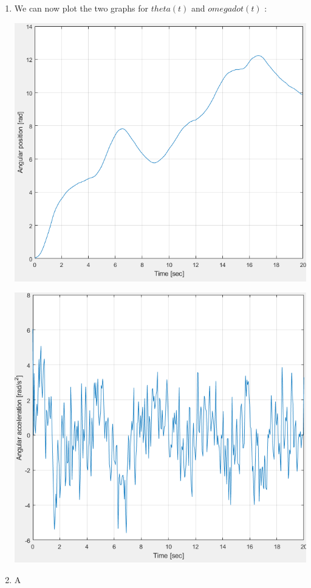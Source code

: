 \documentclass[a4paper,12pt]{article}
\begin{document}
\begin{enumerate}[label={\color{blue}\arabic*)}]
    \item
    We can now plot the two graphs for \(theta(t)\) and \(omega dot(t)\) :
    \begin{multicols}{2}
    \begin{flushleft}
            \includegraphics[width=1\linewidth]{Images/theta.png}
            \label{Figure10}
        \end{flushleft}
    \columnbreak
    \begin{flushright}
            \includegraphics[width=1\linewidth]{Images/omega_dot.png}
            \label{Figure11}
        \end{flushright}
        
    \end{multicols}
    

    \item
    A

\end{enumerate}
\end{document}
